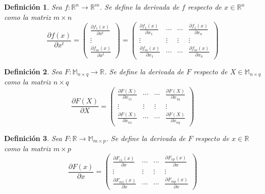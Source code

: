 \documentclass{article}
\theoremstyle{theorem-style}  %
\theoremstyle{definition-style}
\newtheorem{definition}{Definición}[section]
\theoremstyle{example-style}
\theoremstyle{exercise-style}
\begin{document}
\begin{definition}
	Sea $f:\mathbb{R}^n\rightarrow \mathbb{R}^m$. Se define la derivada de $f$ respecto de $x\in \mathbb{R}^n$ como la matriz $m\times n$
	$$ \frac{\partial f(x)}{\partial x^t} = \left( \begin{array}{c}
											\frac{\partial f_1(x)}{\partial x^t} \\ \vdots \\ \frac{\partial f_m(x)}{\partial x^t}
											\end{array}\right) =
											\left( \begin{array}{cccc}
											\frac{\partial f_1(x)}{\partial x_1} & \cdots & \cdots & \frac{\partial f_1(x)}{\partial x_n}\\
											\vdots & \vdots & \vdots & \vdots \\
											\frac{\partial f_m(x)}{\partial x_1} & \cdots & \cdots & \frac{\partial f_m(x)}{\partial x_n}
											\end{array}\right)$$
\end{definition}

\begin{definition}
	Sea $F:\mathbb{M}_{n\times q}\rightarrow \mathbb{R}$. Se define la derivada de $F$ respecto de $X\in \mathbb{M}_{n\times q}$ como la matriz $n\times q$
	$$ \frac{\partial F(X)}{\partial X} = \left( \begin{array}{cccc}
			\frac{\partial F(X)}{\partial x_{11}} & \cdots & \cdots & \frac{\partial F(X)}{\partial x_{1q}}\\
			\vdots & \vdots & \vdots & \vdots \\
			\frac{\partial F(X)}{\partial x_{n1}} & \cdots & \cdots & \frac{\partial F(X)}{\partial x_{nq}}
	\end{array}\right)$$
\end{definition}

\begin{definition}
	Sea $F:\mathbb{R}\rightarrow \mathbb{M}_{m\times p}$. Se define la derivada de $F$ respecto de $x\in \mathbb{R}$ como la matriz $m\times p$
	$$ \frac{\partial F(x)}{\partial x} = \left( \begin{array}{cccc}
			\frac{\partial F_{11}(x)}{\partial x} & \cdots & \cdots & \frac{\partial F_{1p}(x)}{\partial x}\\
			\vdots & \vdots & \vdots & \vdots \\
			\frac{\partial F_{m1}(x)}{\partial x} & \cdots & \cdots & \frac{\partial F_{mp}(x)}{\partial x}
	\end{array}\right)$$	
\end{definition}
\end{document}
